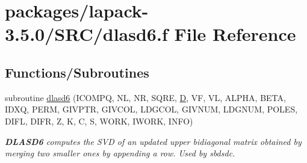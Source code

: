 \hypertarget{dlasd6_8f}{}\section{packages/lapack-\/3.5.0/\+S\+R\+C/dlasd6.f File Reference}
\label{dlasd6_8f}
\subsection*{Functions/\+Subroutines}
\begin{DoxyCompactItemize}
\item 
subroutine \hyperlink{group__auxOTHERauxiliary_ga0e070b3e60c4a799927b934a17031fba}{dlasd6} (I\+C\+O\+M\+P\+Q, N\+L, N\+R, S\+Q\+R\+E, \hyperlink{odrpack_8h_a7dae6ea403d00f3687f24a874e67d139}{D}, V\+F, V\+L, A\+L\+P\+H\+A, B\+E\+T\+A, I\+D\+X\+Q, P\+E\+R\+M, G\+I\+V\+P\+T\+R, G\+I\+V\+C\+O\+L, L\+D\+G\+C\+O\+L, G\+I\+V\+N\+U\+M, L\+D\+G\+N\+U\+M, P\+O\+L\+E\+S, D\+I\+F\+L, D\+I\+F\+R, Z, K, C, S, W\+O\+R\+K, I\+W\+O\+R\+K, I\+N\+F\+O)
\begin{DoxyCompactList}\small\item\em {\bfseries D\+L\+A\+S\+D6} computes the S\+V\+D of an updated upper bidiagonal matrix obtained by merging two smaller ones by appending a row. Used by sbdsdc. \end{DoxyCompactList}\end{DoxyCompactItemize}
